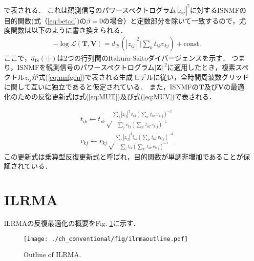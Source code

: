 で表される．
これは観測信号のパワースペクトログラム$|z_{ij}|^2$に対するISNMFの目的関数(式（\ref{eq:betad})の$\beta = 0$の場合）と定数部分を除いて一致するので，尤度関数は以下のように書き換えられる．
\begin{align}
    -\log\mathcal{L}(\bm{T}, \bm{V}) = d_{\mathrm{IS}} \left( |z_{ij}|^2 | \sum_k t_{ik} v_{kj} \right) + \mathrm{const.}
    \label{eq:isnmf}
\end{align}
ここで，$d_{\mathrm{IS}}( \cdot | \cdot )$は2つの行列間のItakura-Saitoダイバージェンスを示す．
つまり，ISNMFを観測信号のパワースペクトログラム$|\bm{Z}|^{.2}$に適用したとき，複素スペクトル$z_{ij}$が式(\ref{eq:nmfgen})で表される生成モデルに従い，全時間周波数グリッドに関して互いに独立であると仮定されている．
また，ISNMFの$\bm{T}$及び$\bm{V}$の最適化のための反復更新式は式(\ref{eq:MUT})及び式(\ref{eq:MUV})で表される\cite{MU}．

\begin{align}
    t_{ik} \leftarrow t_{ik} \sqrt \frac{ \sum_j |z_{ij}|^2 v_{kj} \left( \sum_{k'} t_{ik'} v_{k'j} \right)^{-2} }{ \sum_j v_{kj} \left( \sum_{k'} t_{ik'} v_{k'j} \right)^{-1} } \label{eq:MUT} \\
    v_{kj} \leftarrow v_{kj} \sqrt \frac{ \sum_i |z_{ij}|^2 t_{ik} \left( \sum_{k'} t_{ik'} v_{k'j} \right)^{-2} }{ \sum_i t_{ik} \left( \sum_{k'} t_{ik'} v_{k'j} \right)^{-1} } \label{eq:MUV}
\end{align}
この更新式は乗算型反復更新式と呼ばれ，目的関数が単調非増加であることが保証されている．

\section{ILRMA}
\label{sec:conv:ilrma}

ILRMAの反復最適化の概要をFig. \ref{fig:ilrma_outline}に示す．

\begin{figure}[!t]
\centering
\texttt{[image: ./ch\_conventional/fig/ilrmaoutline.pdf]}
\caption{Outline of ILRMA.}
\label{fig:ilrma_outline}
\end{figure}

